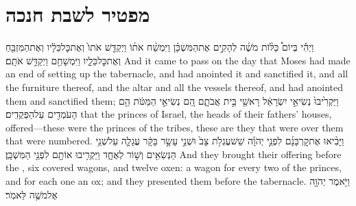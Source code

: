 \documentclass[11pt, openany]{book}
\begin{document}
\vspace{12pt}
\section*{מפטיר לשבת חנכה}
\renewcommand{\haftarahname}{מפטיר לשבת חנכה}
\vspace{-12pt}
\nopagebreak
\label{maft_hanukka}
\setcounter{chap}{7}
\setcounter{verse}{1}
{וַיְהִ֡י בְּיוֹם֩ כַּלּ֨וֹת מֹשֶׁ֜ה לְהָקִ֣ים אֶת\maqqaf הַמִּשְׁכָּ֗ן וַיִּמְשַׁ֨ח אֹת֜וֹ וַיְקַדֵּ֤שׁ אֹתוֹ֙ וְאֶת\maqqaf כׇּל\maqqaf כֵּלָ֔יו וְאֶת\maqqaf הַמִּזְבֵּ֖חַ וְאֶת\maqqaf כׇּל\maqqaf כֵּלָ֑יו וַיִּמְשָׁחֵ֖ם וַיְקַדֵּ֥שׁ אֹתָֽם׃}
{And it came to pass on the day that Moses had made an end of setting up the tabernacle, and had anointed it and sanctified it, and all the furniture thereof, and the altar and all the vessels thereof, and had anointed them and sanctified them;}
{וַיַּקְרִ֙יבוּ֙ נְשִׂיאֵ֣י יִשְׂרָאֵ֔ל רָאשֵׁ֖י בֵּ֣ית אֲבֹתָ֑ם הֵ֚ם נְשִׂיאֵ֣י הַמַּטֹּ֔ת הֵ֥ם הָעֹמְדִ֖ים עַל\maqqaf הַפְּקֻדִֽים׃}
{that the princes of Israel, the heads of their fathers’ houses, offered—these were the princes of the tribes, these are they that were over them that were numbered.}
{וַיָּבִ֨יאוּ אֶת\maqqaf קׇרְבָּנָ֜ם לִפְנֵ֣י יְהֹוָ֗ה שֵׁשׁ\maqqaf עֶגְלֹ֥ת צָב֙ וּשְׁנֵ֣י עָשָׂ֣ר בָּקָ֔ר עֲגָלָ֛ה עַל\maqqaf שְׁנֵ֥י הַנְּשִׂאִ֖ים וְשׁ֣וֹר לְאֶחָ֑ד וַיַּקְרִ֥יבוּ אוֹתָ֖ם לִפְנֵ֥י הַמִּשְׁכָּֽן׃}
{And they brought their offering before the \lord, six covered wagons, and twelve oxen: a wagon for every two of the princes, and for each one an ox; and they presented them before the tabernacle.}
{וַיֹּ֥אמֶר יְהֹוָ֖ה אֶל\maqqaf מֹשֶׁ֥ה לֵּאמֹֽר׃}
\end{document}
